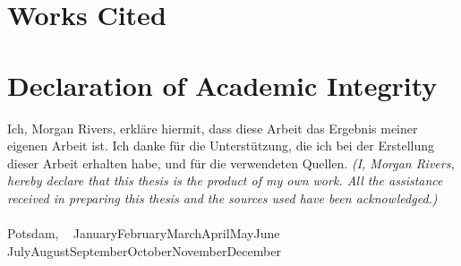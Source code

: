 \documentclass[12pt,a4paper]{article}
\newcommand{\MonthName}{%
  \ifcase\month
  \or January\or February\or March\or April\or May\or June%
  \or July\or August\or September\or October\or November\or December%
  \fi
}
\newcommand{\DateDDMonthYYYY}{\number\day~\MonthName~\number\year}
\begin{document}
\clearpage
\section*{Works Cited}
\printbibliography


\clearpage
\section*{Declaration of Academic Integrity}
Ich, Morgan Rivers, erkläre hiermit, dass diese Arbeit das Ergebnis meiner eigenen Arbeit ist. Ich danke für die Unterstützung, die ich bei der Erstellung dieser Arbeit erhalten habe, und für die verwendeten Quellen.
\emph{(I, Morgan Rivers, hereby declare that this thesis is the product of my own work. All the assistance received in preparing this thesis and the sources used have been acknowledged.)} \\
\\
Potsdam, \DateDDMonthYYYY
\end{document}
